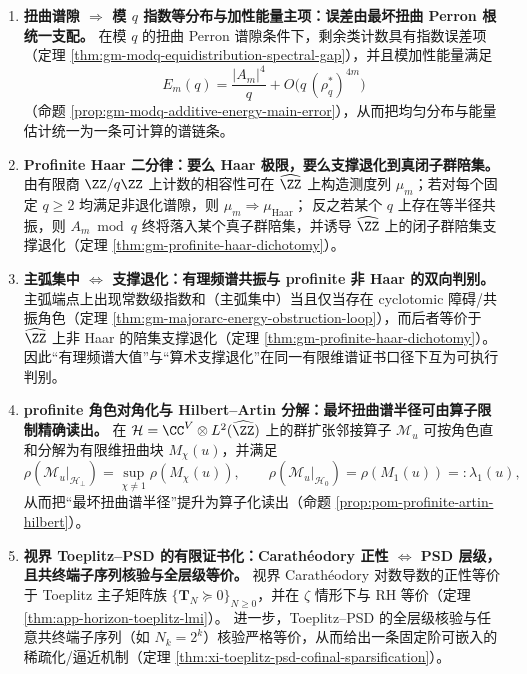 \begin{enumerate}
  \item \textbf{扭曲谱隙 \texorpdfstring{$\Rightarrow$}{=>} 模 \texorpdfstring{$q$}{q} 指数等分布与加性能量主项：误差由最坏扭曲 Perron 根统一支配。}
  在模 \(q\) 的扭曲 Perron 谱隙条件下，剩余类计数具有指数误差项（定理 \ref{thm:gm-modq-equidistribution-spectral-gap}），并且模加性能量满足
  \[
  E_m(q)=\frac{|A_m|^4}{q}+O\!\bigl(q\,(\rho_q^\ast)^{4m}\bigr)
  \]
  （命题 \ref{prop:gm-modq-additive-energy-main-error}），从而把均匀分布与能量估计统一为一条可计算的谱链条。

  \item \textbf{Profinite Haar 二分律：要么 Haar 极限，要么支撑退化到真闭子群陪集。}
  由有限商 \(\ZZ/q\ZZ\) 上计数的相容性可在 \(\widehat{\ZZ}\) 上构造测度列 \(\mu_m\)；若对每个固定 \(q\ge 2\) 均满足非退化谱隙，则 \(\mu_m\Rightarrow \mu_{\mathrm{Haar}}\)；
  反之若某个 \(q\) 上存在等半径共振，则 \(A_m\bmod q\) 终将落入某个真子群陪集，并诱导 \(\widehat{\ZZ}\) 上的闭子群陪集支撑退化（定理 \ref{thm:gm-profinite-haar-dichotomy}）。

  \item \textbf{主弧集中 \texorpdfstring{$\Longleftrightarrow$}{<->} 支撑退化：有理频谱共振与 profinite 非 Haar 的双向判别。}
  主弧端点上出现常数级指数和（主弧集中）当且仅当存在 cyclotomic 障碍/共振角色（定理 \ref{thm:gm-majorarc-energy-obstruction-loop}），而后者等价于 \(\widehat{\ZZ}\) 上非 Haar 的陪集支撑退化（定理 \ref{thm:gm-profinite-haar-dichotomy}）。
  因此“有理频谱大值”与“算术支撑退化”在同一有限维谱证书口径下互为可执行判别。

  \item \textbf{profinite 角色对角化与 Hilbert--Artin 分解：最坏扭曲谱半径可由算子限制精确读出。}
  在 \(\mathcal{H}=\CC^V\otimes L^2(\widehat{\ZZ})\) 上的群扩张邻接算子 \(\mathcal{M}_u\) 可按角色直和分解为有限维扭曲块 \(M_\chi(u)\)，并满足
  \[
  \rho(\mathcal{M}_u|_{\mathcal{H}_\perp})=\sup_{\chi\ne 1}\rho(M_\chi(u)),
  \qquad
  \rho(\mathcal{M}_u|_{\mathcal{H}_0})=\rho(M_1(u))=:\lambda_1(u),
  \]
  从而把“最坏扭曲谱半径”提升为算子化读出（命题 \ref{prop:pom-profinite-artin-hilbert}）。

  \item \textbf{视界 Toeplitz--PSD 的有限证书化：Carath\'eodory 正性 \texorpdfstring{$\Leftrightarrow$}{<->} PSD 层级，且共终端子序列核验与全层级等价。}
  视界 Carath\'eodory 对数导数的正性等价于 Toeplitz 主子矩阵族 \(\{\mathbf{T}_N\succeq 0\}_{N\ge 0}\)，并在 \(\zeta\) 情形下与 RH 等价（定理 \ref{thm:app-horizon-toeplitz-lmi}）。
  进一步，Toeplitz--PSD 的全层级核验与任意共终端子序列（如 \(N_k=2^k\)）核验严格等价，从而给出一条固定阶可嵌入的稀疏化/逼近机制（定理 \ref{thm:xi-toeplitz-psd-cofinal-sparsification}）。
\end{enumerate}

